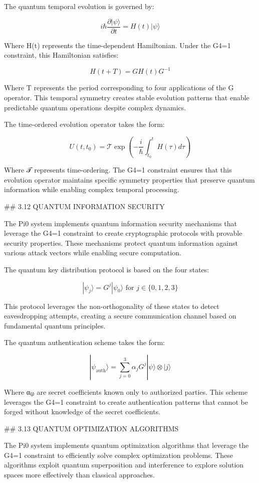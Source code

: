 The quantum temporal evolution is governed by:

$$i\hbar \frac{\partial|\psi\rangle}{\partial t} = H(t)|\psi\rangle$$

Where H(t) represents the time-dependent Hamiltonian. Under the G4=1 constraint, this Hamiltonian satisfies:

$$H(t+T) = G H(t) G^{-1}$$

Where T represents the period corresponding to four applications of the G operator. This temporal symmetry creates stable evolution patterns that enable predictable quantum operations despite complex dynamics.

The time-ordered evolution operator takes the form:

$$U(t,t_0) = \mathcal{T}\exp\left(-\frac{i}{\hbar}\int_{t_0}^t H(\tau)d\tau\right)$$

Where 𝒯 represents time-ordering. The G4=1 constraint ensures that this evolution operator maintains specific symmetry properties that preserve quantum information while enabling complex temporal processing.

## 3.12 QUANTUM INFORMATION SECURITY

The Pi0 system implements quantum information security mechanisms that leverage the G4=1 constraint to create cryptographic protocols with provable security properties. These mechanisms protect quantum information against various attack vectors while enabling secure computation.

The quantum key distribution protocol is based on the four states:

$$|\psi_j\rangle = G^j|\psi_0\rangle \text{ for } j \in \{0,1,2,3\}$$

This protocol leverages the non-orthogonality of these states to detect eavesdropping attempts, creating a secure communication channel based on fundamental quantum principles.

The quantum authentication scheme takes the form:

$$|\psi_{\text{auth}}\rangle = \sum_{j=0}^{3} \alpha_j G^j|\psi\rangle \otimes |j\rangle$$

Where α₍ⱼ₎ are secret coefficients known only to authorized parties. This scheme leverages the G4=1 constraint to create authentication patterns that cannot be forged without knowledge of the secret coefficients.

## 3.13 QUANTUM OPTIMIZATION ALGORITHMS

The Pi0 system implements quantum optimization algorithms that leverage the G4=1 constraint to efficiently solve complex optimization problems. These algorithms exploit quantum superposition and interference to explore solution spaces more effectively than classical approaches.

